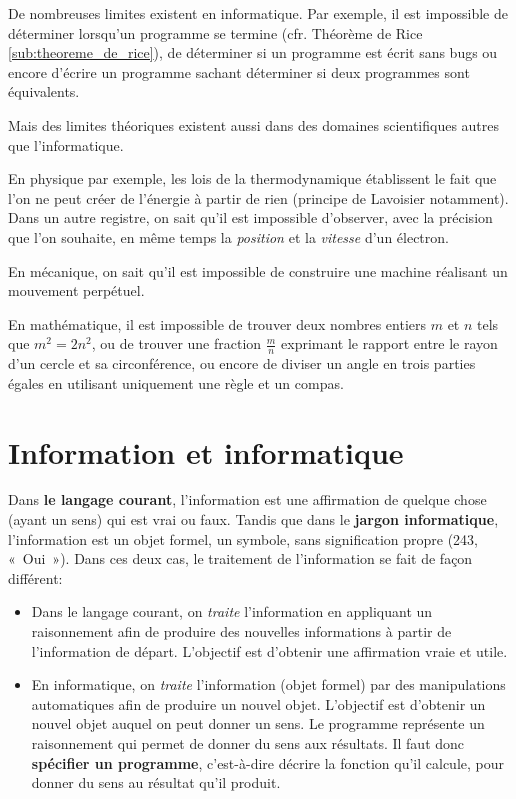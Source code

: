 De nombreuses limites existent en informatique. Par exemple, il est impossible de déterminer lorsqu'un programme se termine (cfr. Théorème de Rice \ref{sub:theoreme_de_rice}), de déterminer si un programme est écrit sans bugs ou encore d'écrire un programme sachant déterminer si deux programmes sont équivalents.

Mais des limites théoriques existent aussi dans des domaines scientifiques autres que l'informatique.

En physique par exemple, les lois de la thermodynamique établissent le fait que l'on ne peut créer de l'énergie à partir de rien (principe de Lavoisier notamment). Dans un autre registre, on sait qu'il est impossible d'observer, avec la précision que l'on souhaite, en même temps la \textit{position} et la \textit{vitesse} d'un électron.

En mécanique, on sait qu'il est impossible de construire une machine réalisant un mouvement perpétuel.

En mathématique, il est impossible de trouver deux nombres entiers $m$ et $n$ tels que $m^2 = 2n^2$, ou de trouver une fraction $\frac{m}{n}$ exprimant le rapport entre le rayon d'un cercle et sa circonférence, ou encore de diviser un angle en trois parties égales en utilisant uniquement une règle et un compas.

\section{Information et informatique}
\label{sec:information_informatique}

Dans \textbf{le langage courant}, l’information est une affirmation de quelque chose (ayant un sens) qui est vrai ou faux. Tandis que dans le \textbf{jargon informatique}, l’information est un objet formel, un symbole, sans signification propre (243, « Oui »).
Dans ces deux cas, le traitement de l'information se fait de façon différent:
\begin{itemize}
	\item Dans le langage courant, on \textit{traite} l'information en appliquant un raisonnement afin de produire des nouvelles informations à partir de l'information de départ. L'objectif est d'obtenir une affirmation vraie et utile.
	\item En informatique, on \textit{traite} l’information (objet formel) par des manipulations automatiques afin de produire un nouvel objet. L’objectif est d’obtenir un nouvel objet auquel on peut donner un sens. Le programme représente un raisonnement qui permet de donner du sens aux résultats. Il faut donc \textbf{spécifier un programme}, c'est-à-dire décrire la fonction qu’il calcule, pour donner du sens au résultat qu’il produit.
\end{itemize}

